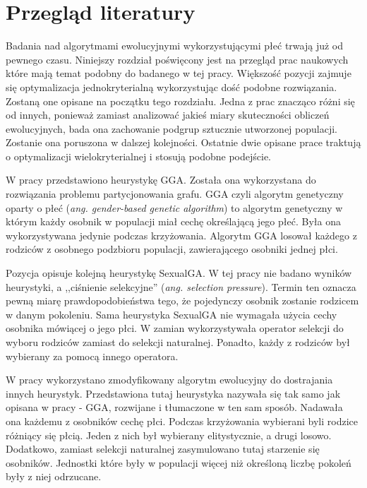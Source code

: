 \documentclass[./FM_mgr.tex]{subfiles}
\begin{document}
\section{Przegląd literatury} \label{chapter:literature}

Badania nad algorytmami ewolucyjnymi wykorzystującymi płeć trwają już od pewnego czasu.
Niniejszy rozdział poświęcony jest na przegląd prac naukowych które mają temat podobny do badanego w tej pracy.
Większość pozycji zajmuje się optymalizacja jednokryterialną wykorzystując dość podobne rozwiązania.
Zostaną one opisane na początku tego rozdziału.
Jedna z prac znacząco różni się od innych, ponieważ zamiast analizować jakieś miary skuteczności obliczeń ewolucyjnych, bada ona zachowanie podgrup sztucznie utworzonej populacji.
Zostanie ona poruszona w dalszej kolejności.
Ostatnie dwie opisane prace traktują o optymalizacji wielokryterialnej i stosują podobne podejście.


W pracy \cite{GGA} przedstawiono heurystykę GGA.
Została ona wykorzystana do rozwiązania problemu partycjonowania grafu.
GGA czyli algorytm genetyczny oparty o płeć (\emph{ang. gender-based genetic algorithm}) to algorytm genetyczny w którym każdy osobnik w populacji miał cechę określającą jego płeć.
Była ona wykorzystywana jedynie podczas krzyżowania.
Algorytm GGA losował każdego z rodziców z osobnego podzbioru populacji, zawierającego osobniki jednej płci.

Pozycja \cite{SexualGA} opisuje kolejną heurystykę SexualGA.
W tej pracy nie badano wyników heurystyki, a ,,ciśnienie selekcyjne'' (\emph{ang. selection pressure}).
Termin ten oznacza pewną miarę prawdopodobieństwa tego, że pojedynczy osobnik zostanie rodzicem w danym pokoleniu.
Sama heurystyka SexualGA nie wymagała użycia cechy osobnika mówiącej o jego płci.
W zamian wykorzystywała operator selekcji do wyboru rodziców zamiast do selekcji naturalnej.
Ponadto, każdy z rodziców był wybierany za pomocą innego operatora.

W pracy \cite{ansotegui} wykorzystano zmodyfikowany algorytm ewolucyjny do dostrajania innych heurystyk.
Przedstawiona tutaj heurystyka nazywała się tak samo jak opisana w pracy \cite{GGA} - GGA, rozwijane i tłumaczone w ten sam sposób.
Nadawała ona każdemu z osobników cechę płci.
Podczas krzyżowania wybierani byli rodzice różniący się płcią.
Jeden z nich był wybierany elitystycznie, a drugi losowo.
Dodatkowo, zamiast selekcji naturalnej zasymulowano tutaj starzenie się osobników.
Jednostki które były w populacji więcej niż określoną liczbę pokoleń były z niej odrzucane.
\end{document}
